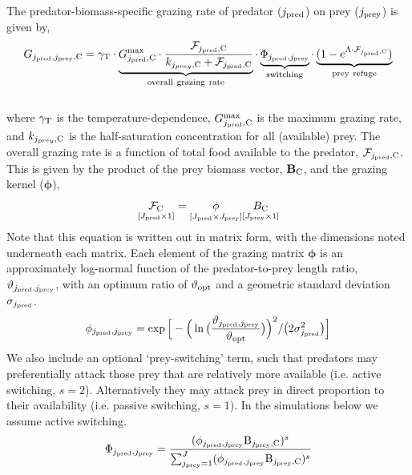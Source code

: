 \documentclass[gmd, manuscript]{copernicus}
\begin{document}
The predator-biomass-specific grazing rate of predator ($j_{\rm pred}$) on prey ($j_{\rm prey}$) is given by,
%
\begin{equation}
G_{j_{\rm pred},j_{\rm prey},{\rm C}} = 
\gamma_{\rm T}
\cdot \underbrace{G_{j_{\rm pred},{\rm C}}^{\rm max} \cdot  \frac{\mathcal{F}_{j_{\rm pred},{\rm C}}}{k_{j_{prey},\rm C} + \mathcal{F}_{j_{\rm pred},{\rm C}} } }_{\rm overall~grazing~rate}
\cdot \underbrace{\Phi_{j_{\rm pred},j_{\rm prey}}}_{\rm switching}
\cdot \underbrace{(1-e^{\Lambda \cdot \mathcal{F}_{j_{\rm pred},{\rm C}}}) }_{\rm prey~refuge}
\label{grazing_func}
\end{equation}
\\
where $\gamma_{\rm T}$ is the temperature-dependence, $G_{j_{\rm pred},{\rm C}}^{\rm max}$ is the maximum grazing rate, and $k_{j_{prey},\rm C}$ is the half-saturation concentration for all (available) prey. The overall grazing rate is a function of total food available to the predator, $\mathcal{F}_{j_{\rm pred},{\rm C}}$. This is given by the product of the prey biomass vector, $\mathbf{B}_{\rm C}$, and the grazing kernel ($\boldsymbol{\phi}$),
%
\begin{equation}
\underset{\scriptsize [J_{\rm pred}\times 1]}{\boldsymbol{\mathcal{F}}_{\rm C}} = \underset{\scriptsize [J_{\rm pred}\times J_{\rm prey}]}{\boldsymbol{\phi}} \underset{\scriptsize [J_{\rm prey}\times 1]}{\boldsymbol{B}_{\rm C}}
\end{equation}
%
Note that this equation is written out in matrix form, with the dimensions noted underneath each matrix. Each element of the grazing matrix $\boldsymbol{\phi}$ is an approximately log-normal function of the predator-to-prey length ratio, $\vartheta_{j_{\rm pred},j_{\rm prey}}$, with an optimum ratio of $\vartheta_{\rm opt}$ and a geometric standard deviation $\sigma_{j_{\rm pred}}$. 
%
\begin{equation}
\phi_{j_{\rm pred},j_{\rm prey}} = \exp\Big[-\Big(\ln\big(\frac{\vartheta_{j_{\rm pred},j_{\rm prey}}}{\vartheta_{\rm opt}}\big)\Big)^2 /\big(2\sigma_{j_{\rm pred}}^2\big) \Big]
\end{equation}
%
We also include an optional `prey-switching' term, such that predators may preferentially attack those prey that are relatively more available (i.e. active switching, $s=2$). Alternatively they may attack prey in direct proportion to their availability (i.e. passive switching, $s=1$). In the simulations below we assume active switching.
%
\begin{equation}
\Phi_{j_{\rm pred},j_{\rm prey}} = \frac{(\phi_{j_{\rm pred},j_{\rm prey}} {\rm B}_{j_{\rm prey},{\rm C}})^{s}}{\sum_{j_{\rm prey}=1}^J (\phi_{j_{\rm pred},j_{\rm prey}} {\rm B}_{j_{\rm prey},{\rm C}})^{s}}
\label{switching}
\end{equation}
\end{document}
